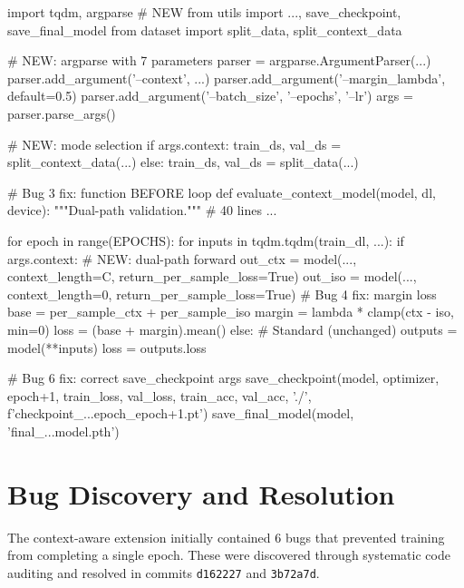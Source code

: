 \documentclass[11pt, a4paper]{report}
\begin{document}
\begin{minipage}[t]{0.48\textwidth}
\begin{newcode}
import tqdm, argparse           # NEW
from utils import ..., save_checkpoint, save_final_model
from dataset import split_data, split_context_data

# NEW: argparse with 7 parameters
parser = argparse.ArgumentParser(...)
parser.add_argument('--context', ...)
parser.add_argument('--margin_lambda', default=0.5)
parser.add_argument('--batch_size', '--epochs', '--lr')
args = parser.parse_args()

# NEW: mode selection
if args.context:
  train_ds, val_ds = split_context_data(...)
else:
  train_ds, val_ds = split_data(...)

# Bug 3 fix: function BEFORE loop
def evaluate_context_model(model, dl, device):
  """Dual-path validation."""  # 40 lines
  ...

for epoch in range(EPOCHS):
  for inputs in tqdm.tqdm(train_dl, ...):
    if args.context:
      # NEW: dual-path forward
      out_ctx = model(..., context_length=C,
                      return_per_sample_loss=True)
      out_iso = model(..., context_length=0,
                      return_per_sample_loss=True)
      # Bug 4 fix: margin loss
      base = per_sample_ctx + per_sample_iso
      margin = lambda * clamp(ctx - iso, min=0)
      loss = (base + margin).mean()
    else:
      # Standard (unchanged)
      outputs = model(**inputs)
      loss = outputs.loss

  # Bug 6 fix: correct save_checkpoint args
  save_checkpoint(model, optimizer, epoch+1,
    train_loss, val_loss, train_acc, val_acc,
    './', f'checkpoint_...epoch_{epoch+1}.pt')
save_final_model(model, 'final_...model.pth')
\end{newcode}
\end{minipage}


\chapter{Bug Discovery and Resolution}
\label{ch:bugs}

The context-aware extension initially contained 6 bugs that prevented training from completing a single epoch. These were discovered through systematic code auditing and resolved in commits \texttt{d162227} and \texttt{3b72a7d}.
\end{document}
